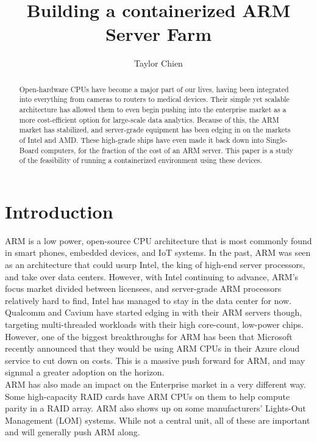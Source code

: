 \documentclass[12pt]{spieman}  %
\title{Building a containerized ARM Server Farm}
\author[a]{Taylor Chien}
\affil[a]{SUNY Polytechnic Institute, Computer Science Department, 100 Seymour Road, Utica, NY, 13502}
\begin{document}
 
\maketitle

\begin{abstract}
Open-hardware CPUs have become a major part of our lives, having been integrated into everything from cameras to routers to medical devices. Their simple yet scalable architecture has allowed them to even begin pushing into the enterprise market as a more cost-efficient option for large-scale data analytics. Because of this, the ARM market has stabilized, and server-grade equipment has been edging in on the markets of Intel and AMD. These high-grade ships have even made it back down into Single-Board computers, for the fraction of the cost of an ARM server. This paper is a study of the feasibility of running a containerized environment using these devices.\\


\end{abstract}

\section{Introduction}
\label{sec:intro}
ARM is a low power, open-source CPU architecture that is most commonly found in smart phones, embedded devices, and IoT systems. In the past, ARM was seen as an architecture that could usurp Intel, the king of high-end server processors, and take over data centers. However, with Intel continuing to advance, ARM's focus market divided between licensees, and server-grade ARM processors relatively hard to find, Intel has managed to stay in the data center for now. Qualcomm and Cavium have started edging in with their ARM servers though, targeting multi-threaded workloads with their high core-count, low-power chips. However, one of the biggest breakthroughs for ARM has been that Microsoft recently announced that they would be using ARM CPUs in their Azure cloud service to cut down on costs\cite{microsoftarm}. This is a massive push forward for ARM, and may signmal a greater adoption on the horizon.\\

ARM has also made an impact on the Enterprise market in a very different way. Some high-capacity RAID cards have ARM CPUs on them to help compute parity in a RAID array. ARM also shows up on some manufacturers' Lights-Out Management (LOM) systems. While not a central unit, all of these are important and will generally push ARM along.\\
\end{document}
